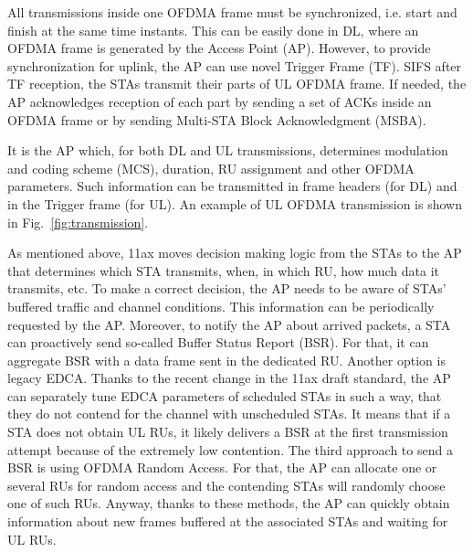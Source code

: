 All transmissions inside one OFDMA frame must be synchronized, i.e. start and finish at the same time instants.
This can be easily done in DL, where an OFDMA frame is generated by the Access Point (AP).
However, to provide synchronization for uplink, the AP can use novel Trigger Frame (TF).
SIFS after TF reception, the STAs transmit their parts of UL OFDMA frame.
If needed, the AP acknowledges reception of each part by sending a set of ACKs inside an OFDMA frame or by sending Multi-STA Block Acknowledgment (MSBA).

It is the AP which, for both DL and UL transmissions, determines modulation and coding scheme (MCS), duration, RU assignment and other OFDMA parameters. Such information can be transmitted in frame headers (for DL) and in the Trigger frame (for UL). An example of UL OFDMA transmission is shown in Fig.~\ref{fig:transmission}. 

As mentioned above, 11ax moves decision making logic from the STAs to the AP that determines which STA transmits, when, in which RU, how much data it transmits, etc.
To make a correct decision, the AP needs to be aware of STAs' buffered traffic and channel conditions.
This information can be periodically requested by the AP.
Moreover, to notify the AP about arrived packets, a STA can proactively send so-called Buffer Status Report (BSR).
For that, it can aggregate BSR with a data frame sent in the dedicated RU.
Another option is legacy EDCA.
Thanks to the recent change in the 11ax draft standard, the AP can separately tune EDCA parameters of scheduled STAs in such a way, that they do not contend for the channel with unscheduled STAs.
It means that if a STA does not obtain UL RUs, it likely delivers a BSR at the first transmission attempt because of the extremely low contention.
The third approach to send a BSR is using OFDMA Random Access.
For that, the AP can allocate one or several RUs for random access and the contending STAs will randomly choose one of such RUs. 
Anyway, thanks to these methods, the AP can quickly obtain information about new frames buffered  at the associated STAs and waiting for UL RUs.

